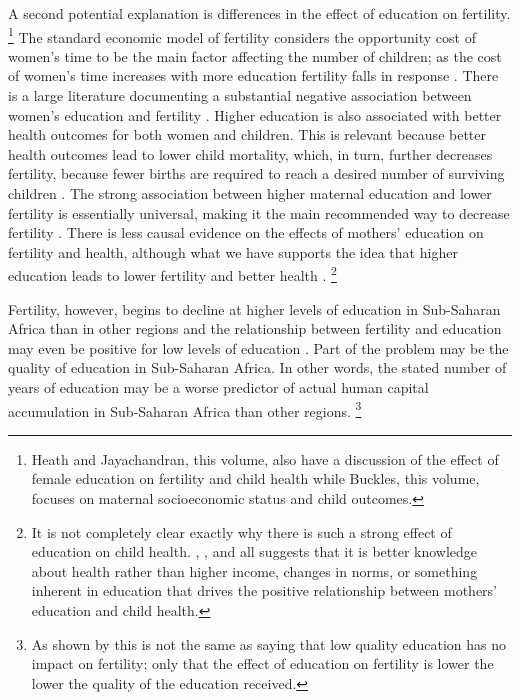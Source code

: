\documentclass[letterpaper,12pt]{article}
\begin{document}
A second potential explanation is differences in the effect of education
on fertility.%
\footnote{
Heath and Jayachandran, this volume, also have a discussion of the
effect of female education on fertility and child health while Buckles,
this volume, focuses on maternal socioeconomic status and child
outcomes.} 
The standard economic model of fertility considers the opportunity cost
of women's time to be the main factor affecting the number of children;
as the cost of women's time increases with more education fertility
falls in response \citep{becker91}. 
There is a large literature documenting a substantial negative
association between women's education and fertility \citep{strauss95}. 
Higher education is also associated with better health outcomes for both
women and children. 
This is relevant because better health outcomes lead to lower child
mortality, which, in turn, further decreases fertility, because fewer
births are required to reach a desired number of surviving children
\citep{Ainsworth1996}. 
The strong association between higher maternal education and lower
fertility is essentially universal, making it the main recommended way
to decrease fertility \citep{schultz02}. 
There is less causal evidence on the effects of mothers' education on
fertility and health, although what we have supports the idea that
higher education leads to lower fertility and better health
\citep{Breierova2004,Behrman2015,Keats2016,Ozier2016}.%
\footnote{
It is not completely clear exactly why there is such a strong effect of
education on child health. 
\citet{Thomas1991}, \citet{Glewwe1999}, and \citet{Kovsted2002} all
suggests that it is better knowledge about health rather than higher
income, changes in norms, or something inherent in education that drives
the positive relationship between mothers' education and child health.}

Fertility, however, begins to decline at higher levels of education in
Sub-Saharan Africa than in other regions and the relationship between
fertility and education may even be positive for low levels of education
\citep{Ainsworth1996,Benefo1996,Thomas1996}. 
Part of the problem may be the quality of education in Sub-Saharan
Africa. 
In other words, the stated number of years of education may be a worse
predictor of actual human capital accumulation in Sub-Saharan Africa
than other regions.%
\footnote{
As shown by \citet{Oye2016} this is not the same as saying that low
quality education has no impact on fertility; only that the effect of
education on fertility is lower the lower the quality of the education
received.}
\end{document}
